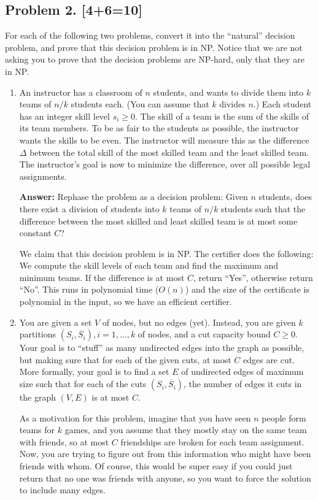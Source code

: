 \documentclass[10pt]{article}
\providecommand{\Compl}[1]{\overline{#1}}
\begin{document}
\subsection*{Problem 2. [4+6=10]}
For each of the following two problems, convert it into the ``natural'' decision problem, and prove that this decision problem is in NP.
Notice that we are not asking you to prove that the decision problems are NP-hard, only that they are in NP.

\begin{enumerate}
\item An instructor has a classroom of $n$ students, and wants to divide them into $k$ teams of $n/k$ students each. (You can assume that $k$ divides $n$.) Each student has an integer skill level $s_i \geq 0$. The skill of a team is the sum of the skills of its team members. To be as fair to the students as possible, the instructor wants the skills to be even. The instructor will measure this as the difference $\Delta$ between the total skill of the most skilled team and the least skilled team. The instructor's goal is now to minimize the difference, over all possible legal assignments.

\textbf{Answer:} Rephase the problem as a decision problem: Given \(n\) students, does there exist a division of students into \(k\) teams of \(n/k\) students such that the difference between the most skilled and least skilled team is at most some constant \(C\)?

We claim that this decision problem is in NP. The certifier does the following: We compute the skill levels of each team and find the maximum and minimum teams. If the difference is at most \(C\), return ``Yes'', otherwise return ``No''. This runs in polynomial time (\(O(n)\)) and the size of the certificate is polynomial in the input, so we have an efficient certifier.

\item You are given a set $V$ of nodes, but no edges (yet). Instead, you are given $k$ partitions $(S_i, \Compl{S}_i), i = 1, \ldots, k$ of nodes, and a cut capacity bound $C \geq 0$. Your goal is to ``stuff'' as many undirected edges into the graph as possible, but making sure that for each of the given cuts, at most $C$ edges are cut. More formally, your goal is to find a set $E$ of undirected edges of maximum size such that for each of the cuts $(S_i, \Compl{S}_i)$, the number of edges it cuts in the graph $(V,E)$ is at most $C$.

As a motivation for this problem, imagine that you have seen $n$ people form teams for $k$ games, and you assume that they mostly stay on the same team with friends, so at most $C$ friendships are broken for each team assignment. Now, you are trying to figure out from this information who might have been friends with whom. Of course, this would be super easy if you could just return that no one was friends with anyone, so you want to force the solution to include many edges.


\end{enumerate}
\end{document}
